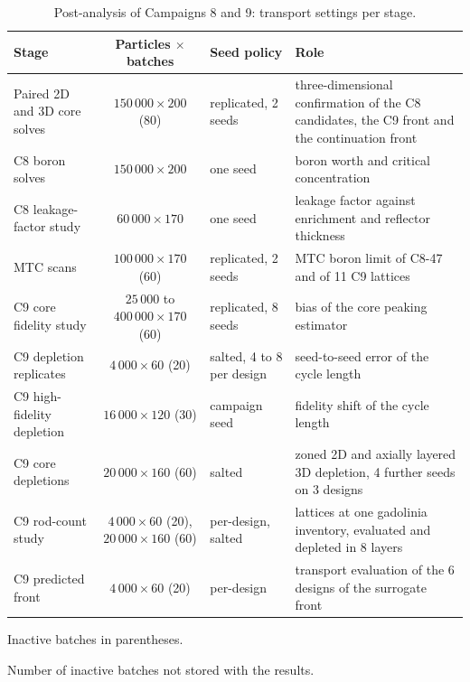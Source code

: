 \begin{table}[!htb]
  \centering
  \begin{threeparttable}
  \caption{Post-analysis of Campaigns 8 and 9: transport settings per stage.}
  \label{tab:fidelity-post}
  \footnotesize
  \begin{tabularx}{\textwidth}{@{}>{\raggedright\arraybackslash}p{}c>{\raggedright\arraybackslash}p{}>{\raggedright\arraybackslash}X@{}}
    \toprule
    Stage & Particles $\times$ batches\tnote{a} & Seed policy & Role \\
    \midrule
    Paired 2D and 3D core solves & $150\,000\times200$ (80) & replicated, 2 seeds & three-dimensional confirmation of the C8 candidates, the C9 front and the continuation front \\
    C8 boron solves & $150\,000\times200$\tnote{b} & one seed & boron worth and critical concentration \\
    C8 leakage-factor study & $60\,000\times170$\tnote{b} & one seed & leakage factor against enrichment and reflector thickness \\
    MTC scans & $100\,000\times170$ (60) & replicated, 2 seeds & MTC boron limit of C8-47 and of 11 C9 lattices \\
    C9 core fidelity study & $25\,000$ to $400\,000\times170$ (60) & replicated, 8 seeds & bias of the core peaking estimator \\
    C9 depletion replicates & $4\,000\times60$ (20) & salted, 4 to 8 per design & seed-to-seed error of the cycle length \\
    C9 high-fidelity depletion & $16\,000\times120$ (30) & campaign seed & fidelity shift of the cycle length \\
        C9 core depletions & $20\,000\times160$ (60) & salted & zoned 2D and axially layered 3D depletion, 4 further seeds on 3 designs \\
    C9 rod-count study & $4\,000\times60$ (20), $20\,000\times160$ (60) & per-design, salted & 5 lattices at one gadolinia inventory, evaluated and depleted in 8 layers \\
    C9 predicted front & $4\,000\times60$ (20) & per-design & transport evaluation of the 6 designs of the surrogate front \\
    \bottomrule
  \end{tabularx}
  \begin{tablenotes}[flushleft]\footnotesize
    \item[a] Inactive batches in parentheses.
    \item[b] Number of inactive batches not stored with the results.
  \end{tablenotes}
  \end{threeparttable}
\end{table}

